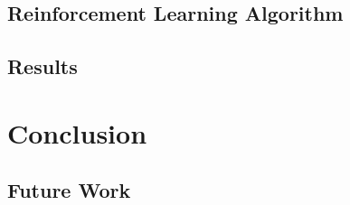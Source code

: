 \documentclass[12pt]{article}
\begin{document}
\subsection{Reinforcement Learning Algorithm}

\subsection{Results}

\section{Conclusion}

\subsection{Future Work}

\newpage


\end{document}
